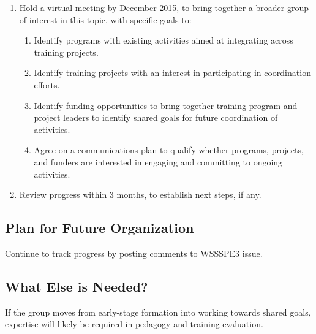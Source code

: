 \begin{enumerate}

\item Hold a virtual meeting by December 2015, to bring together a broader group
of interest in this topic, with specific goals to:

	\begin{enumerate}
	    
	\item Identify programs with existing activities aimed at integrating across
	training projects.
	        
	\item Identify training projects with an interest in participating in
	coordination efforts.
	        
	\item Identify funding opportunities to bring together training program and
	project leaders to identify shared goals for future coordination of activities.
	        
	\item Agree on a communications plan to qualify whether programs, projects, and
	funders are interested in engaging and committing to ongoing activities.
	        
	\end{enumerate}
    
\item Review progress within 3 months, to establish next steps, if any.

\end{enumerate}

\subsection{Plan for Future Organization}

Continue to track progress by posting comments to WSSSPE3 issue.

\subsection{What Else is Needed?}

If the group moves from early-stage formation into working towards shared goals,
expertise will likely be required in pedagogy and training evaluation.

